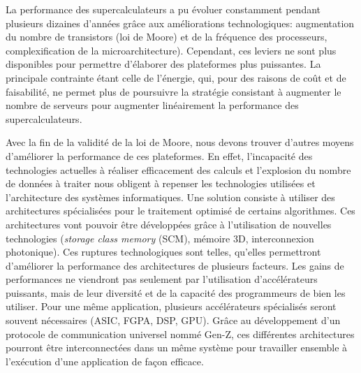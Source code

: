     
        
        La performance des supercalculateurs a pu évoluer constamment pendant plusieurs dizaines d'années grâce aux améliorations technologiques: augmentation du nombre de transistors (loi de Moore) et de la fréquence des processeurs, complexification de la microarchitecture). Cependant, ces leviers ne sont plus disponibles pour permettre d'élaborer des plateformes plus puissantes. La principale contrainte étant celle de l'énergie, qui, pour des raisons de coût et de faisabilité, ne permet plus de poursuivre la stratégie consistant à augmenter le nombre de serveurs pour augmenter linéairement la performance des supercalculateurs. 

        Avec la fin de la validité de la loi de Moore, nous devons trouver d'autres moyens d'améliorer la performance de ces plateformes. En effet, l’incapacité des technologies actuelles à réaliser efficacement des calculs et l’explosion du nombre de données à traiter nous obligent à repenser les technologies utilisées et l’architecture des systèmes informatiques. Une solution consiste à utiliser des architectures spécialisées pour le traitement optimisé de certains algorithmes.  Ces architectures vont pouvoir être développées grâce à l'utilisation de nouvelles technologies (\textit{storage class memory} (SCM), mémoire 3D, interconnexion photonique). Ces ruptures technologiques sont telles, qu'elles permettront d'améliorer la performance des architectures de plusieurs facteurs. Les gains de performances ne viendront pas seulement par l'utilisation d'accélérateurs puissants, mais de leur diversité et de la capacité des programmeurs de bien les utiliser. Pour une même application, plusieurs accélérateurs spécialisés seront souvent nécessaires (ASIC, FGPA, DSP, GPU). Grâce au développement d'un protocole de communication universel nommé Gen-Z, ces différentes architectures pourront être interconnectées dans un même système pour travailler ensemble à l'exécution d'une application de façon efficace.
        
